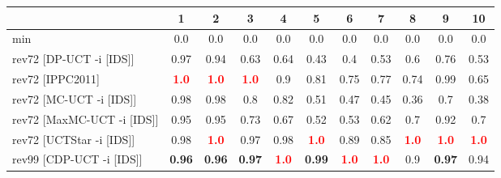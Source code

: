 \documentclass{article}
\begin{document}
\begin{tabular}{|l|r@{$\pm$}rr@{$\pm$}rr@{$\pm$}rr@{$\pm$}rr@{$\pm$}rr@{$\pm$}rr@{$\pm$}rr@{$\pm$}rr@{$\pm$}rr@{$\pm$}r|}
\hline

& \multicolumn{2}{c}{1}
& \multicolumn{2}{c}{2}
& \multicolumn{2}{c}{3}
& \multicolumn{2}{c}{4}
& \multicolumn{2}{c}{5}
& \multicolumn{2}{c}{6}
& \multicolumn{2}{c}{7}
& \multicolumn{2}{c}{8}
& \multicolumn{2}{c}{9}
& \multicolumn{2}{c|}{10}
\\
\hline
\hline
min
& \multicolumn{2}{c}{0.0}
& \multicolumn{2}{c}{0.0}
& \multicolumn{2}{c}{0.0}
& \multicolumn{2}{c}{0.0}
& \multicolumn{2}{c}{0.0}
& \multicolumn{2}{c}{0.0}
& \multicolumn{2}{c}{0.0}
& \multicolumn{2}{c}{0.0}
& \multicolumn{2}{c}{0.0}
& \multicolumn{2}{c|}{0.0}
\\
rev72 [DP-UCT -i [IDS]]
& \multicolumn{2}{c}{0.97}
& \multicolumn{2}{c}{0.94}
& \multicolumn{2}{c}{0.63}
& \multicolumn{2}{c}{0.64}
& \multicolumn{2}{c}{0.43}
& \multicolumn{2}{c}{0.4}
& \multicolumn{2}{c}{0.53}
& \multicolumn{2}{c}{0.6}
& \multicolumn{2}{c}{0.76}
& \multicolumn{2}{c|}{0.53}
\\
rev72 [IPPC2011]
& \multicolumn{2}{c}{\textbf{\textcolor{red}{1.0}}}
& \multicolumn{2}{c}{\textbf{\textcolor{red}{1.0}}}
& \multicolumn{2}{c}{\textbf{\textcolor{red}{1.0}}}
& \multicolumn{2}{c}{0.9}
& \multicolumn{2}{c}{0.81}
& \multicolumn{2}{c}{0.75}
& \multicolumn{2}{c}{0.77}
& \multicolumn{2}{c}{0.74}
& \multicolumn{2}{c}{0.99}
& \multicolumn{2}{c|}{0.65}
\\
rev72 [MC-UCT -i [IDS]]
& \multicolumn{2}{c}{0.98}
& \multicolumn{2}{c}{0.98}
& \multicolumn{2}{c}{0.8}
& \multicolumn{2}{c}{0.82}
& \multicolumn{2}{c}{0.51}
& \multicolumn{2}{c}{0.47}
& \multicolumn{2}{c}{0.45}
& \multicolumn{2}{c}{0.36}
& \multicolumn{2}{c}{0.7}
& \multicolumn{2}{c|}{0.38}
\\
rev72 [MaxMC-UCT -i [IDS]]
& \multicolumn{2}{c}{0.95}
& \multicolumn{2}{c}{0.95}
& \multicolumn{2}{c}{0.73}
& \multicolumn{2}{c}{0.67}
& \multicolumn{2}{c}{0.52}
& \multicolumn{2}{c}{0.53}
& \multicolumn{2}{c}{0.62}
& \multicolumn{2}{c}{0.7}
& \multicolumn{2}{c}{0.92}
& \multicolumn{2}{c|}{0.7}
\\
rev72 [UCTStar -i [IDS]]
& \multicolumn{2}{c}{0.98}
& \multicolumn{2}{c}{\textbf{\textcolor{red}{1.0}}}
& \multicolumn{2}{c}{0.97}
& \multicolumn{2}{c}{0.98}
& \multicolumn{2}{c}{\textbf{\textcolor{red}{1.0}}}
& \multicolumn{2}{c}{0.89}
& \multicolumn{2}{c}{0.85}
& \multicolumn{2}{c}{\textbf{\textcolor{red}{1.0}}}
& \multicolumn{2}{c}{\textbf{\textcolor{red}{1.0}}}
& \multicolumn{2}{c|}{\textbf{\textcolor{red}{1.0}}}
\\
\hline
rev99 [CDP-UCT -i [IDS]]
& \multicolumn{2}{c}{\textbf{0.96}}
& \multicolumn{2}{c}{\textbf{0.96}}
& \multicolumn{2}{c}{\textbf{0.97}}
& \multicolumn{2}{c}{\textbf{\textcolor{red}{1.0}}}
& \multicolumn{2}{c}{\textbf{0.99}}
& \multicolumn{2}{c}{\textbf{\textcolor{red}{1.0}}}
& \multicolumn{2}{c}{\textbf{\textcolor{red}{1.0}}}
& \multicolumn{2}{c}{0.9}
& \multicolumn{2}{c}{\textbf{0.97}}
& \multicolumn{2}{c|}{0.94}
\\
\hline
\end{tabular}%
\end{document}
